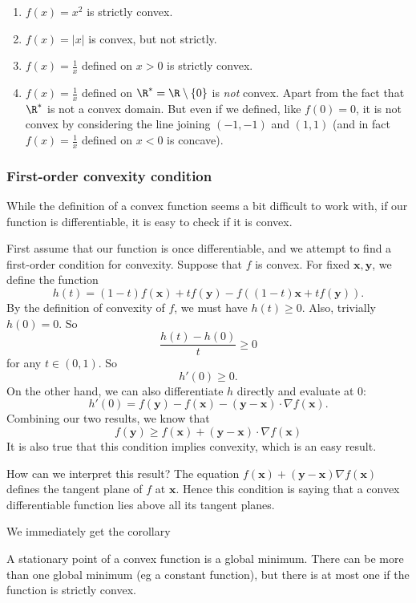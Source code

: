 \documentclass[a4paper]{article}
\begin{document}
\begin{eg}\leavevmode
  \begin{enumerate}
    \item $f(x) = x^2$ is strictly convex.
    \item $f(x) = |x|$ is convex, but not strictly.
    \item $f(x) = \frac{1}{x}$ defined on $x > 0$ is strictly convex.
    \item $f(x) = \frac{1}{x}$ defined on $\R^* = \R \setminus \{0\}$ is \emph{not} convex. Apart from the fact that $\R^*$ is not a convex domain. But even if we defined, like $f(0) = 0$, it is not convex by considering the line joining $(-1, -1)$ and $(1, 1)$ (and in fact $f(x) = \frac{1}{x}$ defined on $x < 0$ is concave).
  \end{enumerate}
\end{eg}
\subsubsection{First-order convexity condition}
While the definition of a convex function seems a bit difficult to work with, if our function is differentiable, it is easy to check if it is convex.

First assume that our function is once differentiable, and we attempt to find a first-order condition for convexity. Suppose that $f$ is convex. For fixed $\mathbf{x}, \mathbf{y}$, we define the function
\[
  h(t) = (1 - t)f(\mathbf{x}) + tf(\mathbf{y}) - f((1 - t)\mathbf{x} + t f(\mathbf{y})).
\]
By the definition of convexity of $f$, we must have $h(t) \geq 0$. Also, trivially $h(0) = 0$. So
\[
  \frac{h(t) - h(0)}{t} \geq 0
\]
for any $t\in (0, 1)$. So
\[
  h'(0) \geq 0.
\]
On the other hand, we can also differentiate $h$ directly and evaluate at $0$:
\[
  h'(0) = f(\mathbf{y}) - f(\mathbf{x}) - (\mathbf{y} - \mathbf{x})\cdot \nabla f (\mathbf{x}).
\]
Combining our two results, we know that
\[
  f(\mathbf{y}) \geq f(\mathbf{x}) + (\mathbf{y} - \mathbf{x})\cdot \nabla f(\mathbf{x}) \tag{$\dagger$}
\]
It is also true that this condition implies convexity, which is an easy result.

How can we interpret this result? The equation $f(\mathbf{x}) + (\mathbf{y} - \mathbf{x})\nabla f(\mathbf{x})$ defines the tangent plane of $f$ at $\mathbf{x}$. Hence this condition is saying that a convex differentiable function lies above all its tangent planes.

We immediately get the corollary
\begin{cor}
  A stationary point of a convex function is a global minimum. There can be more than one global minimum (eg a constant function), but there is at most one if the function is strictly convex.
\end{cor}
\end{document}
